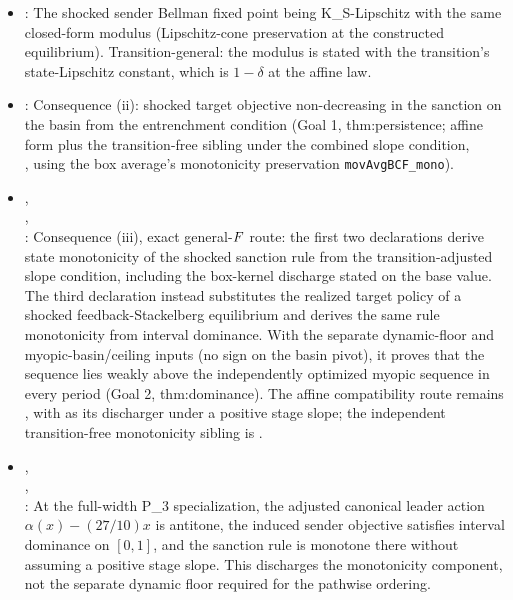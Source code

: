 \begin{itemize}[leftmargin=1.4em,itemsep=1pt]
\item {}: The shocked sender Bellman fixed point being K\_S-Lipschitz with the same closed-form modulus (Lipschitz-cone preservation at the constructed equilibrium). Transition-general: the modulus is stated with the transition's state-Lipschitz constant, which is $1-\delta$ at the affine law.
\item {}: Consequence (ii): shocked target objective non-decreasing in the sanction on the basin from the entrenchment condition (Goal 1, thm:persistence; affine form plus the transition-free sibling under the combined slope condition,\\
, using the box average's monotonicity preservation \texttt{movAvgBCF\_mono}).
\item {},\\
,\\
:
Consequence (iii), exact general-$F$ route: the first two declarations
derive state monotonicity of the shocked sanction rule from the
transition-adjusted slope condition, including the box-kernel discharge stated on the
base value.  The third declaration instead substitutes the realized target
policy of a shocked feedback-Stackelberg equilibrium and derives the same rule
monotonicity from interval dominance.  With the separate dynamic-floor and
myopic-basin/ceiling inputs (no sign on the basin pivot), it proves that the
 sequence lies weakly above the independently optimized
myopic sequence in every period (Goal 2, thm:dominance).  The affine
compatibility route remains
, with
 as its
discharger under a positive stage slope; the independent transition-free monotonicity sibling
is .
\item {},\\
,\\
: At the full-width P\_3 specialization, the adjusted canonical leader action $\alpha(x)-(27/10)x$ is antitone, the induced sender objective satisfies interval dominance on $[0,1]$, and the sanction rule is monotone there without assuming a positive stage slope.  This discharges the monotonicity component, not the separate dynamic floor required for the pathwise ordering.

\end{itemize}
